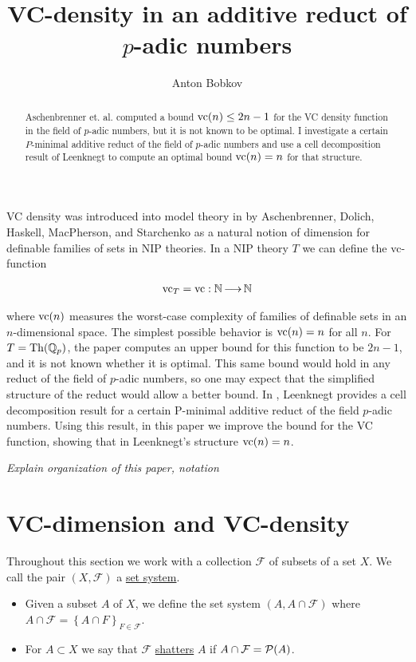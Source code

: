 \documentclass{amsart}
\title{VC-density in an additive reduct of $p$-adic numbers}
\author{Anton Bobkov}
\newcommand{\F}{\mathcal F}
\newcommand{\curly}[1]{\left\{#1\right\}}
\newcommand{\defn}{\underline}
\begin{document}
\begin{abstract}
  Aschenbrenner et. al. computed a bound $\operatorname{vc}(n) \leq 2n - 1$ for the VC density function in the field of $p$-adic numbers,
  but it is not known to be optimal.
  I investigate a certain $P$-minimal additive reduct of the field of $p$-adic numbers and
  use a cell decomposition result of Leenknegt to compute an optimal bound $\operatorname{vc}(n) = n$ for that structure.
\end{abstract}


\maketitle

VC density was introduced into model theory in \cite{density} by Aschenbrenner, Dolich, Haskell, MacPherson, and Starchenko
as a natural notion of dimension for definable families of sets in NIP theories.
In a NIP theory $T$ we can define the vc-function

\begin{align*}
  \operatorname{vc}_T = \operatorname{vc} : \mathbb{N} \operatorname{\longrightarrow} \mathbb{N}
\end{align*}

where $\operatorname{vc}(n)$ measures the worst-case complexity of families of definable sets in an $n$-dimensional space.
The simplest possible behavior is $\operatorname{vc}(n) = n$ for all $n$.
For $T = \operatorname{Th}(\mathbb{Q}_p)$, the paper \cite{density} computes an upper bound for this function to be $2n-1$, and it is not known whether it is optimal.
This same bound would hold in any reduct of the field of $p$-adic numbers, so one may expect that the simplified structure of the reduct would allow a better bound.
In \cite{reduct}, Leenknegt provides a cell decomposition result for a certain P-minimal additive reduct of the field $p$-adic numbers.
Using this result, in this paper we improve the bound for the VC function, showing that in Leenknegt's structure $\operatorname{vc}(n) = n$.

\emph{Explain organization of this paper, notation}


\section{VC-dimension and VC-density}




\begin{Definition}
  Throughout this section we work with a collection $\F$ of subsets of a set $X$.
  We call the pair $(X, \F)$ a \defn{set system}.
  \begin{itemize}
  \item Given a subset $A$ of $X$, we define the set system $(A, A \cap \F)$
      where $A \cap \F = \curly{A \cap F}_{F\in \F}$.
  \item For $A \subset X$ we say that $\F$ \defn{shatters} $A$ if $A \cap \F = \PP(A)$.
  \end{itemize}    
\end{Definition}  
\end{document}
